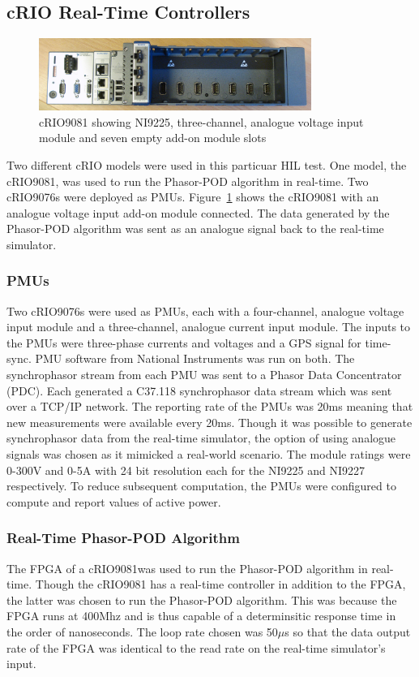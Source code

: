 \documentclass[conference]{IEEEtran}
\begin{document}
\subsection{cRIO Real-Time Controllers}
\begin{figure}[H]
\centering
\includegraphics[width=3.5in]{DSC05446.JPG}
\vspace{-0.5em}
\caption{cRIO9081 showing NI9225, three-channel, analogue voltage input module and seven empty add-on module slots}
\label{cRIO}
\end{figure}
Two different cRIO models were used in this particuar HIL test. One model, the cRIO9081, was used to run the Phasor-POD algorithm in real-time. Two cRIO9076s were deployed as PMUs. Figure~\ref{cRIO} shows the cRIO9081 with an analogue voltage input add-on module connected. The data generated by the Phasor-POD algorithm was sent as an analogue signal back to the real-time simulator. 

\subsubsection*{PMUs} Two cRIO9076s were used as PMUs, each with a four-channel, analogue voltage input module and a three-channel, analogue current input module. The inputs to the PMUs were three-phase currents and voltages and a GPS signal for time-sync. PMU software from National Instruments was run on both. The synchrophasor stream from each PMU was sent to a Phasor Data Concentrator (PDC). Each generated a C37.118 synchrophasor data stream which was sent over a TCP/IP network. The reporting rate of the PMUs was 20ms meaning that new measurements were available every 20ms. Though it was possible to generate synchrophasor data from the real-time simulator, the option of using analogue signals was chosen as it mimicked a real-world scenario. The module ratings were 0-300V and 0-5A with 24 bit resolution each\cite{cRIO9081} for the NI9225 and NI9227 respectively. To reduce subsequent computation, the PMUs were configured to compute and report values of active power.

\subsubsection*{Real-Time Phasor-POD Algorithm} The FPGA of a cRIO9081was used to run the Phasor-POD algorithm in real-time. Though the cRIO9081 has a real-time controller in addition to the FPGA, the latter was chosen to run the Phasor-POD algorithm. This was because the FPGA runs at 400Mhz and is thus capable of a determinsitic response time in the order of nanoseconds. The loop rate chosen was 50$\mu$s so that the data output rate of the FPGA was identical to the read rate on the real-time simulator's input.
\end{document}
